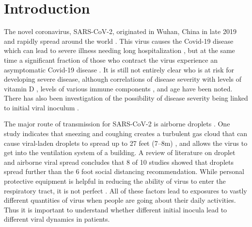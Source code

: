 \section{Introduction}

The novel coronavirus, SARS-CoV-2, originated in Wuhan, China in late 2019 and rapidly spread around the world \citep{chen20,wu20}. This virus causes the Covid-19 disease which can lead to severe illness needing long hospitalization \citep{sun20,goyal20,jiang20}, but at the same time a significant fraction of those who contract the virus experience an asymptomatic Covid-19 disease \citep{he20}. It is still not entirely clear who is at risk for developing severe disease, although correlations of disease severity with levels of vitamin D \citep{ilie20}, levels of various immune components \citep{liu20imm,liu20imm2,zhang20imm,yang20imm}, and age \citep{borghesi20,zhang20imm} have been noted. There has also been investigation of the possibility of disease severity being linked to initial viral inoculum \citep{little20, guallar20, ghandi20}.

The major route of transmission for SARS-CoV-2 is airborne droplets \citep{morawska20}. One study indicates that sneezing and coughing creates a turbulent gas cloud that can cause viral-laden droplets to spread up to 27 feet (\numrange[range-phrase = --]{7}{8}\si{\meter}) \citep{bourouiba20}, and allows the virus to get into the ventilation system of a building. A review of literature on droplet and airborne viral spread concludes that 8 of 10 studies showed that droplets spread further than the 6 foot \citep{bahl20} social distancing recommendation. While personal protective equipment is helpful in reducing the ability of virus to enter the respiratory tract, it is not perfect \citep{mittal20}. All of these factors lead to exposures to vastly different quantities of virus when people are going about their daily activities. Thus it is important to understand whether different initial inocula lead to different viral dynamics in patients. 

